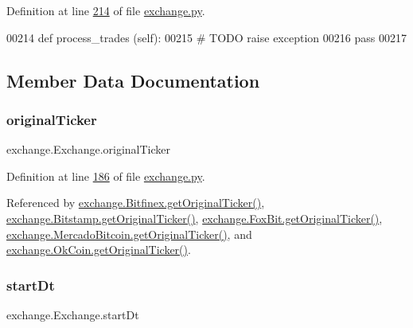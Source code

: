 Definition at line \hyperlink{exchange_8py_source_l00214}{214} of file \hyperlink{exchange_8py_source}{exchange.\+py}.


\begin{DoxyCode}
00214     \textcolor{keyword}{def }process\_trades (self):
00215         \textcolor{comment}{# TODO raise exception}
00216         \textcolor{keywordflow}{pass}
00217     
\end{DoxyCode}


\subsection{Member Data Documentation}
\mbox{\label{classexchange_1_1_exchange_ae326ce8c325672f3f555af59f22fd9f6}} 
\subsubsection{\texorpdfstring{original\+Ticker}{originalTicker}}
{\footnotesize\ttfamily exchange.\+Exchange.\+original\+Ticker}



Definition at line \hyperlink{exchange_8py_source_l00186}{186} of file \hyperlink{exchange_8py_source}{exchange.\+py}.



Referenced by \hyperlink{exchange_8py_source_l00476}{exchange.\+Bitfinex.\+get\+Original\+Ticker()}, \hyperlink{exchange_8py_source_l00548}{exchange.\+Bitstamp.\+get\+Original\+Ticker()}, \hyperlink{exchange_8py_source_l00625}{exchange.\+Fox\+Bit.\+get\+Original\+Ticker()}, \hyperlink{exchange_8py_source_l00688}{exchange.\+Mercado\+Bitcoin.\+get\+Original\+Ticker()}, and \hyperlink{exchange_8py_source_l00747}{exchange.\+Ok\+Coin.\+get\+Original\+Ticker()}.

\mbox{\label{classexchange_1_1_exchange_a62e9159cbcc09db3c06b1b5622da39d4}} 
\subsubsection{\texorpdfstring{start\+Dt}{startDt}}
{\footnotesize\ttfamily exchange.\+Exchange.\+start\+Dt}



